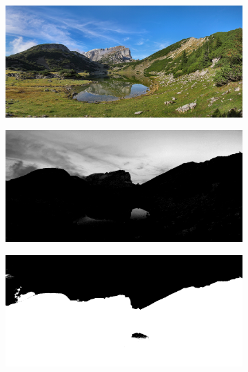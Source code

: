 \documentclass[12pt,a4paper,titlepage]{scrartcl}
\begin{document}
\begin{figure}[h!]
\centering
\begin{subfigure}[c]{0.49\textwidth}
\includegraphics[width=\textwidth]{../Bilder/Zireiner_See_Rofanspitze_2006_10.jpg}
\label{simg:Alle_Orig}
\end{subfigure}
%
\begin{subfigure}[c]{0.49\textwidth}
\includegraphics[width=\textwidth]{../Bilder/Sky_Blackening_FirstStep.jpg}
\label{simg:Alle_Trans}
\end{subfigure}
%
\begin{subfigure}[c]{0.49\textwidth}
\includegraphics[width=\textwidth]{../Bilder/Sky_Blackening_SecondStep.jpg}

\end{subfigure}
\end{figure}
\end{document}
